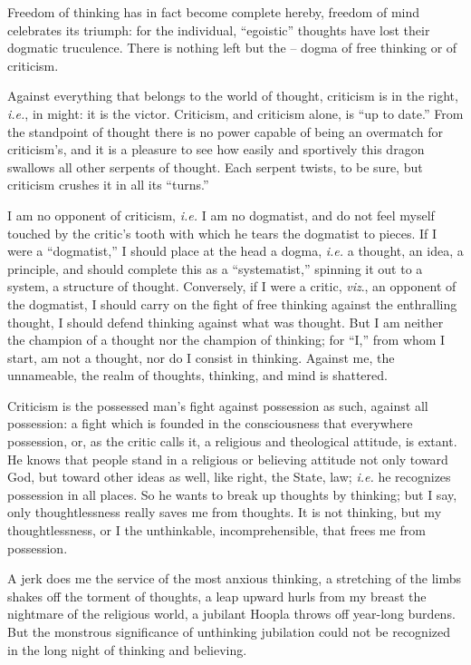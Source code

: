 Freedom of thinking has in fact become complete hereby, freedom of mind 
celebrates its triumph: for the individual, ``egoistic'' thoughts have lost 
their dogmatic truculence. There is nothing left but the -- dogma of free 
thinking or of criticism.

Against everything that belongs to the world of thought, criticism is in the 
right, \textit{i.e.}, in might: it is the victor. Criticism, and criticism 
alone, is ``up to date.'' From the standpoint of thought there is no power 
capable of being an overmatch for criticism's, and it is a pleasure to see how 
easily and sportively this dragon swallows all other serpents of thought. Each 
serpent twists, to be sure, but criticism crushes it in all its ``turns.''

I am no opponent of criticism, \textit{i.e.} I am no dogmatist, and do not 
feel myself touched by the critic's tooth with which he tears the dogmatist to 
pieces. If I were a ``dogmatist,'' I should place at the head a dogma, 
\textit{i.e.} a thought, an idea, a principle, and should complete this as a 
``systematist,'' spinning it out to a system, a structure of thought. 
Conversely, if I were a critic, \textit{viz}., an opponent of the dogmatist, I 
should carry on the fight of free thinking against the enthralling thought, I 
should defend thinking against what was thought. But I am neither the champion 
of a thought nor the champion of thinking; for ``I,'' from whom I start, am 
not a thought, nor do I consist in thinking. Against me, the unnameable, the 
realm of thoughts, thinking, and mind is shattered.

Criticism is the possessed man's fight against possession as such, against all 
possession: a fight which is founded in the consciousness that everywhere 
possession, or, as the critic calls it, a religious and theological attitude, 
is extant. He knows that people stand in a religious or believing attitude not 
only toward God, but toward other ideas as well, like right, the State, law; 
\textit{i.e.} he recognizes possession in all places. So he wants to break up 
thoughts by thinking; but I say, only thoughtlessness really saves me from 
thoughts. It is not thinking, but my thoughtlessness, or I the unthinkable, 
incomprehensible, that frees me from possession.

A jerk does me the service of the most anxious thinking, a stretching of the 
limbs shakes off the torment of thoughts, a leap upward hurls from my breast 
the nightmare of the religious world, a jubilant Hoopla throws off year-long 
burdens. But the monstrous significance of unthinking jubilation could not be 
recognized in the long night of thinking and believing.

